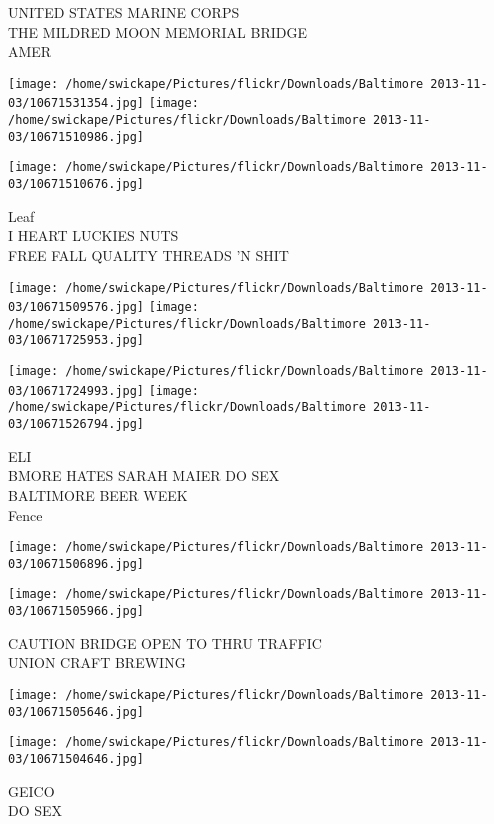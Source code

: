 \documentclass[10pt,letterpaper]{article}
\begin{document}
UNITED STATES MARINE CORPS\\
THE MILDRED MOON MEMORIAL BRIDGE\\
AMER
\pagebreak

\texttt{[image: /home/swickape/Pictures/flickr/Downloads/Baltimore 2013-11-03/10671531354.jpg]}
\texttt{[image: /home/swickape/Pictures/flickr/Downloads/Baltimore 2013-11-03/10671510986.jpg]}

\vspace{0.25in}
\texttt{[image: /home/swickape/Pictures/flickr/Downloads/Baltimore 2013-11-03/10671510676.jpg]}

Leaf\\
I HEART LUCKIES NUTS\\
FREE FALL QUALITY THREADS 'N SHIT
\pagebreak

\texttt{[image: /home/swickape/Pictures/flickr/Downloads/Baltimore 2013-11-03/10671509576.jpg]}
\texttt{[image: /home/swickape/Pictures/flickr/Downloads/Baltimore 2013-11-03/10671725953.jpg]}

\texttt{[image: /home/swickape/Pictures/flickr/Downloads/Baltimore 2013-11-03/10671724993.jpg]}
\texttt{[image: /home/swickape/Pictures/flickr/Downloads/Baltimore 2013-11-03/10671526794.jpg]}

ELI\\
BMORE HATES SARAH MAIER DO SEX\\
BALTIMORE BEER WEEK\\
Fence
\pagebreak

\texttt{[image: /home/swickape/Pictures/flickr/Downloads/Baltimore 2013-11-03/10671506896.jpg]}

\vspace{0.25in}
\texttt{[image: /home/swickape/Pictures/flickr/Downloads/Baltimore 2013-11-03/10671505966.jpg]}

CAUTION BRIDGE OPEN TO THRU TRAFFIC\\
UNION CRAFT BREWING
\pagebreak

\texttt{[image: /home/swickape/Pictures/flickr/Downloads/Baltimore 2013-11-03/10671505646.jpg]}

\vspace{0.25in}
\texttt{[image: /home/swickape/Pictures/flickr/Downloads/Baltimore 2013-11-03/10671504646.jpg]}

GEICO\\
DO SEX
\pagebreak
\end{document}
